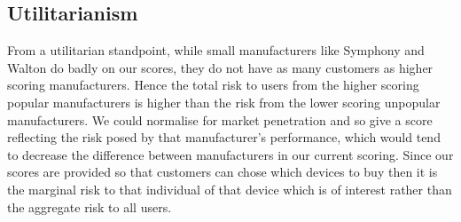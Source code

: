 \subsection{Utilitarianism}
From a utilitarian standpoint, while small manufacturers like Symphony and Walton do badly on our scores, they do not have as many customers as higher scoring manufacturers.
Hence the total risk to users from the higher scoring popular manufacturers is higher than the risk from the lower scoring unpopular manufacturers.
We could normalise for market penetration and so give a score reflecting the risk posed by that manufacturer's performance, which would tend to decrease the difference between manufacturers in our current scoring.
Since our scores are provided so that customers can chose which devices to buy then it is the marginal risk to that individual of that device which is of interest rather than the aggregate risk to all users.


